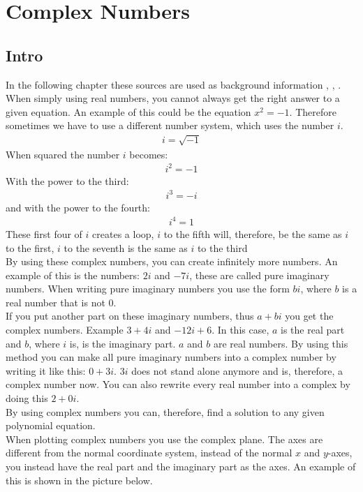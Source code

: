 
\chapter{Complex Numbers}

\section{Intro}
In the following chapter these sources are used as background information \cite{complexpaul}, \cite{complexpurple}, \cite{complexnotebook}.
When simply using real numbers, you cannot always get the right answer to a given equation. An example of this could be the equation $x^2=-1$. Therefore sometimes we have to use a different number system, which uses the number $i$. 
\begin{align*}
i=\sqrt{-1}
\end{align*}
When squared the number $i$ becomes:
\begin{align*}
i^2=-1
\end{align*}
With the power to the third:
\begin{align*}
i^3=-i
\end{align*}
and with the power to the fourth:
\begin{align*}
i^4=1
\end{align*}
These first four of $i$ creates a loop, $i$ to the fifth will, therefore, be the same as $i$ to the first, $i$ to the seventh is the same as $i$ to the third \\
By using these complex numbers, you can create infinitely more numbers.  
An example of this is the numbers: $2i$ and $-7i$, these are called pure imaginary numbers. When writing pure imaginary numbers you use the form $bi$, where $b$ is a real number that is not $0$. \\
If you put another part on these imaginary numbers, thus $a+bi$ you get the complex numbers. Example $3+4i$ and $-12i+6$. In this case, $a$ is the real part and $b$, where $i$ is, is the imaginary part. $a$ and $b$ are real numbers. By using this method you can make all pure imaginary numbers into a complex number by writing it like this: $0+3i$. $3i$ does not stand alone anymore and is, therefore, a complex number now. You can also rewrite every real number into a complex by doing this $2+0i$. \\
By using complex numbers you can, therefore, find a solution to any given polynomial equation. \\ 
When plotting complex numbers you use the complex plane. The axes are different from the normal coordinate system, instead of the normal $x$ and $y$-axes, you instead have the real part and the imaginary part as the axes. An example of this is shown in the picture below.

